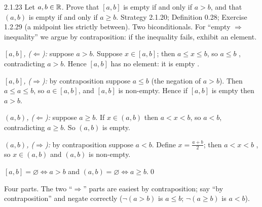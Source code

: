 \begin{bookex}[recommended]{2.1.23}
Let $a,b\in\mathbb{R}$. Prove that $[a,b]$ is empty if and only if $a>b$, and that $(a,b)$ is empty if and only if $a\ge b$.
\solution
\given Strategy 2.1.20; Definition 0.28; Exercise 1.2.29 (a midpoint lies strictly between).
\goal Two biconditionals. For ``empty $\Rightarrow$ inequality'' we argue by contraposition: if the inequality fails, exhibit an element.
\begin{steps}
\item \emph{$[a,b]$, ($\Leftarrow$):} suppose $a>b$. Suppose $x\in[a,b]$; then $a\le x\le b$, so $a\le b$ , contradicting $a>b$. Hence $[a,b]$ has no element: it is empty .
\item \emph{$[a,b]$, ($\Rightarrow$):} by contraposition  suppose $a\le b$ (the negation of $a>b$). Then $a\le a\le b$, so $a\in[a,b]$, and $[a,b]$ is non-empty. Hence if $[a,b]$ is empty then $a>b$.
\item \emph{$(a,b)$, ($\Leftarrow$):} suppose $a\ge b$. If $x\in(a,b)$ then $a<x<b$, so $a<b$, contradicting $a\ge b$. So $(a,b)$ is empty.
\item \emph{$(a,b)$, ($\Rightarrow$):} by contraposition suppose $a<b$. Define $x=\frac{a+b}2$; then $a<x<b$ , so $x\in(a,b)$ and $(a,b)$ is non-empty.
\end{steps}
\conclusion $[a,b]=\varnothing\Leftrightarrow a>b$ and $(a,b)=\varnothing\Leftrightarrow a\ge b$.\qed
\begin{compare}
\item Four parts. The two ``$\Rightarrow$'' parts are easiest by contraposition; say ``by contraposition'' and negate correctly ($\neg(a>b)$ is $a\le b$; $\neg(a\ge b)$ is $a<b$).
\end{compare}
\end{bookex}


